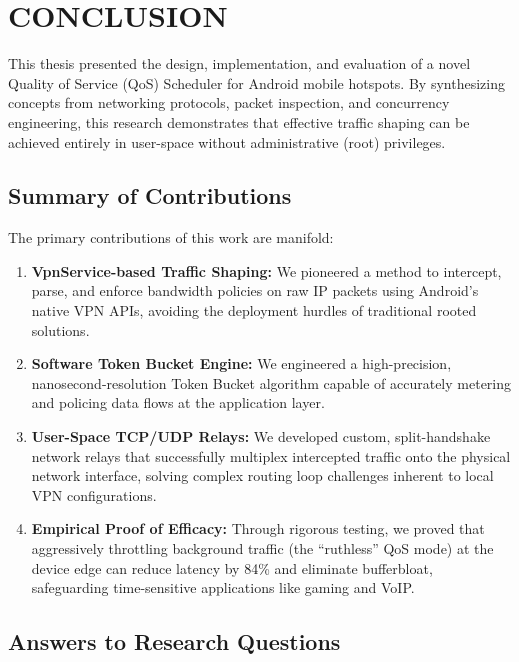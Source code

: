 
\chapter{CONCLUSION}
\label{chap:conclusion}

This thesis presented the design, implementation, and evaluation of a novel Quality of Service (QoS) Scheduler for Android mobile hotspots. By synthesizing concepts from networking protocols, packet inspection, and concurrency engineering, this research demonstrates that effective traffic shaping can be achieved entirely in user-space without administrative (root) privileges.

\section{Summary of Contributions}
\label{sec:contributions_summary}

The primary contributions of this work are manifold:
\begin{enumerate}
    \item \textbf{VpnService-based Traffic Shaping:} We pioneered a method to intercept, parse, and enforce bandwidth policies on raw IP packets using Android's native VPN APIs, avoiding the deployment hurdles of traditional rooted solutions.
    \item \textbf{Software Token Bucket Engine:} We engineered a high-precision, nanosecond-resolution Token Bucket algorithm capable of accurately metering and policing data flows at the application layer.
    \item \textbf{User-Space TCP/UDP Relays:} We developed custom, split-handshake network relays that successfully multiplex intercepted traffic onto the physical network interface, solving complex routing loop challenges inherent to local VPN configurations.
    \item \textbf{Empirical Proof of Efficacy:} Through rigorous testing, we proved that aggressively throttling background traffic (the ``ruthless'' QoS mode) at the device edge can reduce latency by 84\% and eliminate bufferbloat, safeguarding time-sensitive applications like gaming and VoIP.
\end{enumerate}

\section{Answers to Research Questions}
\label{sec:rq_answers}


